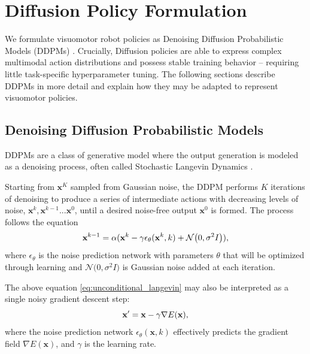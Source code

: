 \documentclass[Afour,sageh,times]{sagej}
\begin{document}
\section{Diffusion Policy Formulation}
\label{sec:method}

We formulate visuomotor robot policies as Denoising Diffusion Probabilistic Models (DDPMs) \cite{ho2020denoising}. Crucially, Diffusion policies are able to express complex multimodal action distributions and possess stable training behavior -- requiring little task-specific hyperparameter tuning.
The following sections describe DDPMs in more detail and explain how they may be adapted to represent visuomotor policies.

\subsection{Denoising Diffusion Probabilistic Models}
\label{sec:ddpm}
DDPMs are a class of generative model where the output generation is modeled as a denoising process, often called Stochastic Langevin Dynamics \cite{welling2011bayesian}.

Starting from $\mathbf{x}^K$ sampled from Gaussian noise, the DDPM performs $K$ iterations of denoising to produce a series of intermediate actions with decreasing levels of noise,
$\mathbf{x}^k, \mathbf{x}^{k-1} ...\mathbf{x}^{0} $, until a desired noise-free output $\mathbf{x}^0$ is formed.
The process follows the equation
\vspace{-1mm}
\begin{equation}
    \textbf{x}^{k-1}=\alpha(\textbf{x}^{k}-\gamma\epsilon_\theta(\mathbf{x}^k,k) + \mathcal{N} \bigl(0, \sigma^2 I \bigl)),
    \label{eq:unconditional_langevin}
\vspace{-1mm}
\end{equation}
where $\epsilon_\theta$ is the noise prediction network with parameters $\theta$ that will be optimized through learning and $\mathcal{N} \bigl(0, \sigma^2 I \bigl)$ is Gaussian noise added at each iteration.


The above equation \ref{eq:unconditional_langevin} may also be interpreted as a single noisy gradient descent step:
\vspace{-2mm}
\begin{equation}
    \mathbf{x}'=\mathbf{x}-\gamma\nabla E(\mathbf{x}),
    \label{eq:gradient_descent}
\vspace{-1mm}
\end{equation}
where the noise prediction network $\epsilon_\theta(\mathbf{x},k)$ effectively predicts the gradient field $\nabla E(\mathbf{x})$, and  $\gamma$ is the learning rate.
\end{document}
